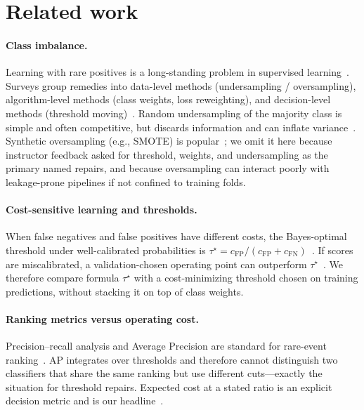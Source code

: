 \documentclass[10pt,twocolumn,letterpaper]{article}
\begin{document}
\section{Related work}
\paragraph{Class imbalance.}
Learning with rare positives is a long-standing problem in supervised learning~\cite{he2009learning,japkowicz2002class}.
Surveys group remedies into data-level methods (undersampling / oversampling), algorithm-level methods (class weights, loss reweighting), and decision-level methods (threshold moving)~\cite{he2009learning,krawczyk2016learning}.
Random undersampling of the majority class is simple and often competitive, but discards information and can inflate variance~\cite{drummond2003c4}.
Synthetic oversampling (e.g., SMOTE) is popular~\cite{chawla2002smote}; we omit it here because instructor feedback asked for threshold, weights, and undersampling as the primary named repairs, and because oversampling can interact poorly with leakage-prone pipelines if not confined to training folds.

\paragraph{Cost-sensitive learning and thresholds.}
When false negatives and false positives have different costs, the Bayes-optimal threshold under well-calibrated probabilities is
$\tau^{\star}=c_{\mathrm{FP}}/(c_{\mathrm{FP}}+c_{\mathrm{FN}})$~\cite{elkan2001foundations,provost2001robust}.
If scores are miscalibrated, a validation-chosen operating point can outperform $\tau^{\star}$~\cite{zadrozny2001learning}.
We therefore compare formula $\tau^{\star}$ with a cost-minimizing threshold chosen on training predictions, without stacking it on top of class weights.

\paragraph{Ranking metrics versus operating cost.}
Precision--recall analysis and Average Precision are standard for rare-event ranking~\cite{davis2006relationship,saito2015precision}.
AP integrates over thresholds and therefore cannot distinguish two classifiers that share the same ranking but use different cuts---exactly the situation for threshold repairs.
Expected cost at a stated ratio is an explicit decision metric and is our headline~\cite{drummond2006machine}.
\end{document}
